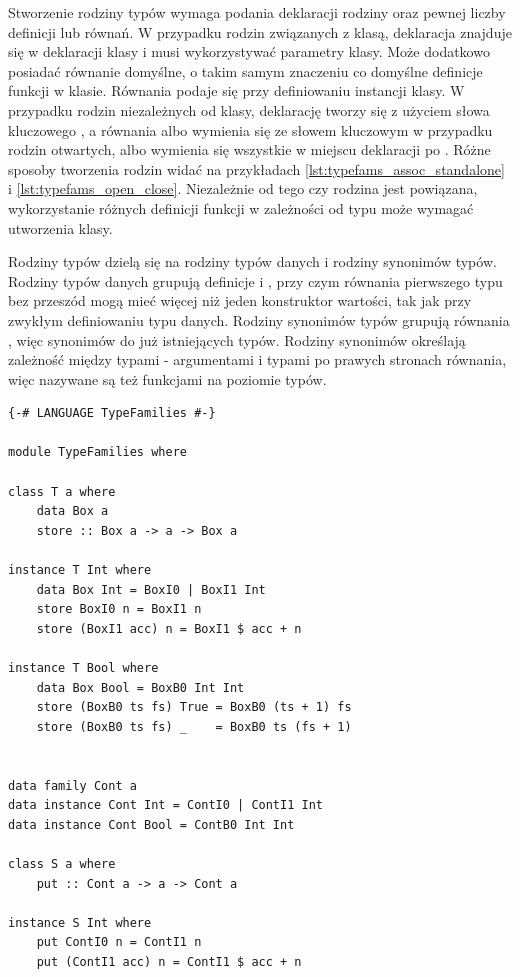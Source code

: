 {Stworzenie rodziny typów wymaga podania deklaracji rodziny oraz pewnej liczby definicji lub równań. W przypadku rodzin związanych z klasą, deklaracja znajduje się w deklaracji klasy i musi wykorzystywać parametry klasy. Może dodatkowo posiadać równanie domyślne, o takim samym znaczeniu co domyślne definicje funkcji w klasie. Równania podaje się przy definiowaniu instancji klasy. W przypadku rodzin niezależnych od klasy, deklarację tworzy się z użyciem słowa kluczowego , a równania albo wymienia się ze słowem kluczowym  w przypadku rodzin otwartych, albo wymienia się wszystkie w miejscu deklaracji po . Różne sposoby tworzenia rodzin widać na przykładach \ref{lst:typefams_assoc_standalone} i \ref{lst:typefams_open_close}. Niezależnie od tego czy rodzina jest powiązana, wykorzystanie różnych definicji funkcji w zależności od typu może wymagać utworzenia klasy.

Rodziny typów dzielą się na rodziny typów danych i rodziny synonimów typów. Rodziny typów danych grupują definicje  i , przy czym równania pierwszego typu bez przeszód mogą mieć więcej niż jeden konstruktor wartości, tak jak przy zwykłym definiowaniu typu danych. Rodziny synonimów typów grupują równania , więc synonimów do już istniejących typów. Rodziny synonimów określają zależność między typami - argumentami i typami po prawych stronach równania, więc nazywane są też funkcjami na poziomie typów.

\begin{lstlisting}[float,label={lst:typefams_assoc_standalone},
                   caption={Przykład pozwiązanej z klasą i niezależnej rodziny typów.}]
{-# LANGUAGE TypeFamilies #-}

module TypeFamilies where

class T a where
    data Box a
    store :: Box a -> a -> Box a

instance T Int where
    data Box Int = BoxI0 | BoxI1 Int
    store BoxI0 n = BoxI1 n
    store (BoxI1 acc) n = BoxI1 $ acc + n

instance T Bool where
    data Box Bool = BoxB0 Int Int
    store (BoxB0 ts fs) True = BoxB0 (ts + 1) fs
    store (BoxB0 ts fs) _    = BoxB0 ts (fs + 1)


data family Cont a
data instance Cont Int = ContI0 | ContI1 Int
data instance Cont Bool = ContB0 Int Int

class S a where
    put :: Cont a -> a -> Cont a

instance S Int where
    put ContI0 n = ContI1 n
    put (ContI1 acc) n = ContI1 $ acc + n


\end{lstlisting}}
